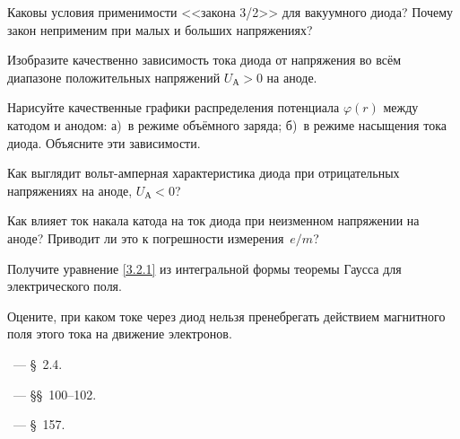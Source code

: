 \begin{lab:questions}
    
    \item Каковы условия применимости <<закона 3/2>> для вакуумного диода?
    Почему закон неприменим при малых и больших напряжениях?
    
    \item Изобразите качественно зависимость тока диода от напряжения
    во всём диапазоне положительных напряжений $U_{А}>0$ на аноде.
    
	\item Нарисуйте качественные графики распределения потенциала $\varphi(r)$ 
    между катодом и анодом: а)~в режиме объёмного заряда;
б)~в режиме насыщения тока диода. Объясните эти зависимости.

    \item Как выглядит вольт-амперная характеристика диода при отрицательных
    напряжениях на аноде, $U_{А}<0$?

	\item Как влияет ток накала катода на ток диода при неизменном напряжении
на аноде? Приводит ли это к погрешности измерения~$e/m$?

    \item Получите уравнение \eqref{3.2.1} из интегральной формы теоремы Гаусса
    для электрического поля.
    
    \item Оцените, при каком токе через диод нельзя пренебрегать
    действием магнитного поля этого тока на движение электронов.

\end{lab:questions}

\begin{lab:literature}
    \item \Kirichenko~--- \S~2.4.
	\item \SivuhinIII~--- \S\S~100--102.
	\item \Kalashnikov~--- \S~157.
\end{lab:literature}

